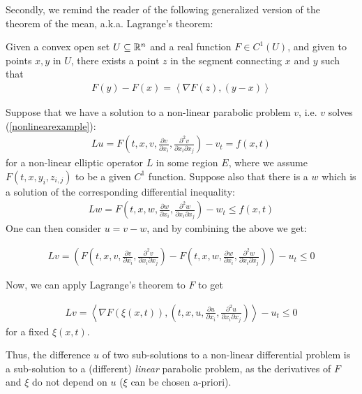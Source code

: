 Secondly, we remind the reader of the following generalized version of the theorem of the mean, a.k.a. Lagrange's theorem:
\begin{theorem}
	Given a convex open set $U\subseteq \mathbb{R}^n$ and a real function $F \in C^1(U)$, and given to points $x, y$ in $U$, there exists a point $z$ in the segment connecting $x$ and $y$ such that 
	\begin{align*}
		F(y)-F(x) =\left\langle \nabla F(z), (y-x) \right\rangle 
	\end{align*}
\end{theorem}
Suppose that we have a solution to a non-linear parabolic problem $v$, i.e. $v$ solves (\ref{nonlinearexample}):
\begin{align*}
	Lu= F\left(t, x, v, \frac{\partial v}{\partial x_i} , \frac{\partial^2 v}{\partial x_i \partial x_j}\right)-v_t = f(x, t)
\end{align*}
for a non-linear elliptic operator $L$ in some region $E$, where we assume $F(t, x, y_i, z_{i,j})$ to be a given $C^1$ function. Suppose also that there is a $w$ which is a solution of the corresponding differential inequality:
\begin{align*}
	Lw= F\left(t, x, w, \frac{\partial w}{\partial x_i} , \frac{\partial^2 w}{\partial x_i \partial x_j}\right)-w_t \leq f(x, t)
\end{align*}
One can then consider $u = v-w$, and by combining the above we get: 

\begin{align*}
	Lv= \left( F\left(t, x, v, \frac{\partial v}{\partial x_i} , \frac{\partial^2 v}{\partial x_i \partial x_j}\right) - F\left(t, x, w, \frac{\partial w}{\partial x_i} , \frac{\partial^2 w}{\partial x_i \partial x_j}\right)\right)-u_t \leq 0
\end{align*}

Now, we can apply Lagrange's theorem to $F$ to get 

\begin{align*}
	Lv= \left\langle \nabla F(\xi(x, t)), \left(t, x, u, \frac{\partial u}{\partial x_i} , \frac{\partial^2 u}{\partial x_i \partial x_j}\right) \right\rangle-u_t \leq 0
\end{align*}
for a fixed $\xi(x, t)$.


Thus, the difference $u$ of two sub-solutions to a non-linear differential problem is a sub-solution to a (different) \textit{linear} parabolic problem, as the derivatives of $F$ and $\xi$ do not depend on $u$ ($\xi$ can be chosen a-priori).

